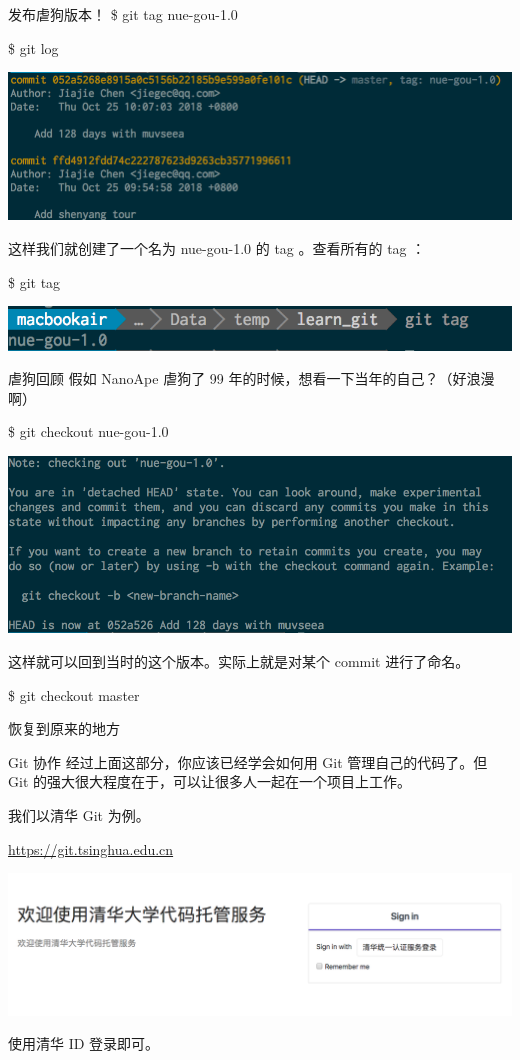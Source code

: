 \documentclass{beamer}
\begin{document}
\begin{frame}{发布虐狗版本！}
    \$ git tag nue-gou-1.0

    \$ git log

    \includegraphics[width=\linewidth]{2018-10-25-11-16-26.png}

    这样我们就创建了一个名为 nue-gou-1.0 的 tag 。查看所有的 tag ：

    \$ git tag

    \includegraphics[width=\linewidth]{2018-10-25-11-18-36.png}
\end{frame}

\begin{frame}{虐狗回顾}
    假如 NanoApe 虐狗了 99 年的时候，想看一下当年的自己？（好浪漫啊）

    \$ git checkout nue-gou-1.0

    \includegraphics[width=\linewidth]{2018-10-25-11-21-49.png}

    这样就可以回到当时的这个版本。实际上就是对某个 commit 进行了命名。

    \$ git checkout master

    恢复到原来的地方
\end{frame}

\begin{frame}{Git 协作}
    经过上面这部分，你应该已经学会如何用 Git 管理自己的代码了。但 Git 的强大很大程度在于，可以让很多人一起在一个项目上工作。

    我们以清华 Git 为例。

    \url{https://git.tsinghua.edu.cn}

    \includegraphics[width=\linewidth]{2018-10-25-11-31-40.png}

    使用清华 ID 登录即可。
\end{frame}
\end{document}
